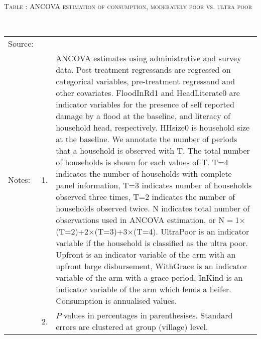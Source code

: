 \hspace{-1cm}\begin{minipage}[t]{14cm}
\hfil\textsc{\normalsize Table \thetable: ANCOVA estimation of consumption, moderately poor vs. ultra poor\label{tab ANCOVA consumption2 original HH}}\\
\setlength{\tabcolsep}{1pt}
\setlength{\baselineskip}{8pt}
\renewcommand{\arraystretch}{.55}
\hfil{}\\
\renewcommand{\arraystretch}{.8}
\setlength{\tabcolsep}{1pt}
\begin{tabular}{>{\hfill\scriptsize}p{1cm}<{}>{\hfill\scriptsize}p{.25cm}<{}>{\scriptsize}p{12cm}<{\hfill}}
Source:& \multicolumn{2}{l}{\scriptsize Estimated with GUK administrative and survey data.}\\
Notes: & 1. & ANCOVA estimates using administrative and survey data. Post treatment regressands are regressed on categorical variables, pre-treatment regressand and other covariates. \textsf{FloodInRd1} and \textsf{HeadLiterate0} are indicator variables for the presence of self reported damage by a flood at the baseline, and literacy of household head, respectively. \textsf{HHsize0} is household size at the baseline. We annotate the number of periods that a household is observed with \textsf{T}. The total number of households is shown for each values of \textsf{T}. \textsf{T=4} indicates the number of households with complete panel information, \textsf{T=3} indicates number of households observed three times, \textsf{T=2} indicates the number of households observed twice. \textsf{N} indicates total number of observations used in ANCOVA estimation, or \textsf{N$=$1$\times$(T=2)+2$\times$(T=3)+3$\times$(T=4)}.  \textsf{UltraPoor} is an indicator variable if the household is classified as the ultra poor. \textsf{Upfront} is an indicator variable of the arm with an upfront large disbursement, \textsf{WithGrace} is an indicator variable of the arm with a grace period, \textsf{InKind} is an indicator variable of the arm which lends a heifer. Consumption is annualised values. \\
& 2. & $P$ values in percentages in parenthesises. Standard errors are clustered at group (village) level.
\end{tabular}
\end{minipage}


